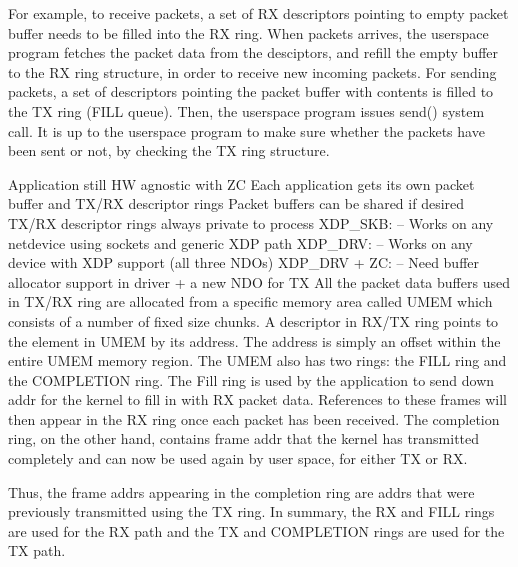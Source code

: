 \documentclass[10pt]{sigplanconf}
\begin{document}
For example, to receive packets, a set of RX descriptors pointing to empty
packet buffer needs to be filled into the RX ring.  When packets arrives,
the userspace program fetches the packet data from the desciptors, and
refill the empty buffer to the RX ring structure, in order to receive new
incoming packets.  For sending packets, a set of descriptors pointing the
packet buffer with contents is filled to the TX ring (FILL queue).
Then, the userspace
program issues send() system call.  It is up to the userspace program to
make sure whether the packets have been sent or not, by checking the TX
ring structure.

Application still HW agnostic with ZC
Each application gets its own packet buffer and TX/RX descriptor rings
Packet buffers can be shared if desired
  TX/RX descriptor rings always private to process
XDP\_SKB:
– Works on any netdevice using sockets and generic XDP path
XDP\_DRV:
– Works on any device with XDP support (all three NDOs)
XDP\_DRV + ZC:
– Need buffer allocator support in driver + a new NDO for TX
All the packet data buffers used in TX/RX ring are allocated from a specific
memory area called UMEM which consists of a number of fixed size chunks.
A descriptor in RX/TX ring points to the element in UMEM by its address.
The address is simply an offset within the entire UMEM memory region.
The UMEM also has two rings: the FILL ring and the COMPLETION ring.
The Fill ring is used by the application to send down addr for the kernel
to fill in with RX packet data. References to these frames will then
appear in the RX ring once each packet has been received. The 
completion ring, on the other hand, contains frame addr that the 
kernel has transmitted completely and can now be used again by user
space, for either TX or RX. 

Thus, the frame addrs appearing in the 
completion ring are addrs that were previously transmitted using the 
TX ring. In summary, the RX and FILL rings are used for the RX path
and the TX and COMPLETION rings are used for the TX path.
\end{document}
